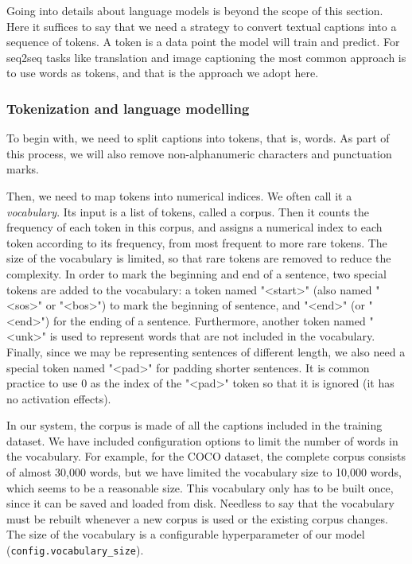 Going into details about language models is beyond the scope of this section. Here it suffices to say that we need a strategy to convert textual captions into a sequence of tokens. A token is a data point the model will train and predict. For seq2seq tasks like translation and image captioning the most common approach is to use words as tokens, and that is the approach we adopt here.

\subsubsection{Tokenization and language modelling}\label{subsec:tokenization}

To begin with, we need to split captions into tokens, that is, words. As part of this process, we will also remove non-alphanumeric characters and punctuation marks. 

Then, we need to map tokens into numerical indices. We often call it a \textit{vocabulary}. Its input is a list of tokens, called a corpus. Then it counts the frequency of each token in this corpus, and assigns a numerical index to each token according to its frequency, from most frequent to more rare tokens. The size of the vocabulary is limited, so that rare tokens are removed to reduce the complexity. In order to mark the beginning and end of a sentence, two special tokens are added to the vocabulary: a token named "<start>" (also  named "<sos>" or "<bos>") to mark the beginning of sentence, and "<end>" (or "<end>") for the ending of a sentence. Furthermore, another token named "<unk>" is used to represent words that are not included in the vocabulary. Finally, since we may be representing sentences of different length, we also need a special token named "<pad>" for padding shorter sentences. It is common practice to use 0 as the index of the "<pad>" token so that it is ignored (it has no activation effects).  

In our system, the corpus is made of all the captions included in the training dataset. We have included configuration options to limit the number of words in the vocabulary. For example, for the COCO dataset, the complete corpus consists of almost 30,000 words, but we have limited the vocabulary size to 10,000 words, which seems to be a reasonable size. This vocabulary only has to be built once, since it can be saved and loaded from disk. Needless to say that the vocabulary must be rebuilt whenever a new corpus is used or the existing corpus changes. The size of the vocabulary is a configurable hyperparameter of our model (\lstinline{config.vocabulary_size}).


